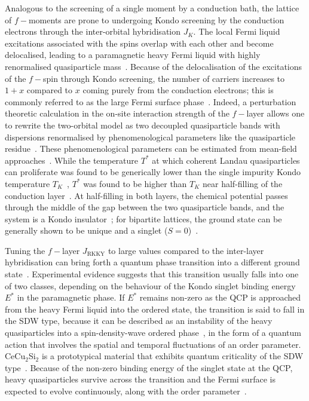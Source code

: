 Analogous to the screening of a single moment by a conduction bath, the lattice of \(f-\)moments are prone to undergoing Kondo screening by the conduction electrons through the inter-orbital hybridisation \(J_K\). The local Fermi liquid excitations associated with the spins overlap with each other and become delocalised, leading to a paramagnetic heavy Fermi liquid with highly renormalised quasiparticle mass~\cite{si_2013}. Because of the delocalisation of the excitations of the \(f-\)spin through Kondo screening, the number of carriers increases to \(1+x\) compared to \(x\) coming purely from the conduction electrons; this is commonly referred to as the large Fermi surface phase~\cite{si_2006}. Indeed, a perturbation theoretic calculation in the on-site interaction strength of the \(f-\)layer allows one to rewrite the two-orbital model as two decoupled quasiparticle bands with dispersions renormalised by phenomenological parameters like the quasiparticle residue~\cite{hewson1993}. These phenomenological parameters can be estimated from mean-field approaches~\cite{newns_1987,houghton_1988}. While the temperature \(T^*\) at which coherent Landau quasiparticles can proliferate was found to be generically lower than the single impurity Kondo temperature \(T_K\)~\cite{burdin_2000}, \(T^*\) was found to be higher than \(T_K\) near half-filling of the conduction layer~\cite{pruschke_2000}. At half-filling in both layers, the chemical potential passes through the middle of the gap between the two quasiparticle bands, and the system is a Kondo insulator~\cite{tsunetsugu_1997}; for bipartite lattices, the ground state can be generally shown to be unique and a singlet (\(S=0\))~\cite{ueda_1992,shen_1996,tsunetsugu_1997_prb}.

Tuning the \(f-\)layer \(J_\text{RKKY}\) to large values compared to the inter-layer hybridisation can bring forth a quantum phase transition into a different ground state~\cite{Si2010Science}. Experimental evidence suggests that this transition usually falls into one of two classes, depending on the behaviour of the Kondo singlet binding energy \(E^*\) in the paramagnetic phase. If \(E^*\) remains non-zero as the QCP is approached from the heavy Fermi liquid into the ordered state, the transition is said to fall in the SDW type, because it can be described as an instability of the heavy quasiparticles into a spin-density-wave ordered phase~\cite{hertz_1976,moriya_1985,millis_1993}, in the form of a quantum action that involves the spatial and temporal fluctuations of an order parameter. CeCu$_2$Si$_2$ is a prototypical material that exhibits quantum criticality of the SDW type~\cite{Wirth2016}. Because of the non-zero binding energy of the singlet state at the QCP, heavy quasiparticles survive across the transition and the Fermi surface is expected to evolve continuously, along with the order parameter~\cite{Coleman_2001,si_2003}.


